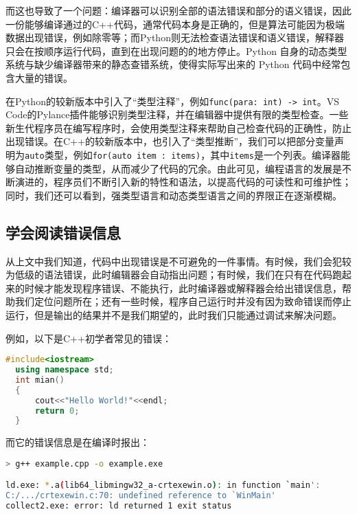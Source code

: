 \documentclass[../main.tex]{subfiles}
\begin{document}
而这也导致了一个问题：编译器可以识别全部的语法错误和部分的语义错误，因此一份能够编译通过的C++代码，通常代码本身是正确的，但是算法可能因为极端数据出现错误，例如除零等；而Python则无法检查语法错误和语义错误，解释器只会在按顺序运行代码，直到在出现问题的的地方停止。Python 自身的动态类型系统与缺少编译器带来的静态查错系统，使得实际写出来的 Python 代码中经常包含大量的错误。

\begin{note}
  在Python的较新版本中引入了“类型注释”，例如\texttt{func(para: int) -> int}。VS Code的Pylance插件能够识别类型注释，并在编辑器中提供有限的类型检查。一些新生代程序员在编写程序时，会使用类型注释来帮助自己检查代码的正确性，防止出现错误。在C++的较新版本中，也引入了“类型推断”，我们可以把部分变量声明为\texttt{auto}类型，例如\texttt{for(auto item : items)}，其中\texttt{items}是一个列表。编译器能够自动推断变量的类型，从而减少了代码的冗余。由此可见，编程语言的发展是不断演进的，程序员们不断引入新的特性和语法，以提高代码的可读性和可维护性；同时，我们还可以看到，强类型语言和动态类型语言之间的界限正在逐渐模糊。
\end{note}

\subsection{学会阅读错误信息}

从上文中我们知道，代码中出现错误是不可避免的一件事情。有时候，我们会犯较为低级的语法错误，此时编辑器会自动指出问题；有时候，我们在只有在代码跑起来的时候才能发现程序错误、不能执行，此时编译器或解释器会给出错误信息，帮助我们定位问题所在；还有一些时候，程序自己运行时并没有因为致命错误而停止运行，但是输出的结果并不是我们期望的，此时我们只能通过调试来解决问题。

例如，以下是C++初学者常见的错误：

\begin{lstlisting}[language=C++]
  #include<iostream>
  using namespace std;
  int mian()
  {
      cout<<"Hello World!"<<endl;
      return 0;
  }
\end{lstlisting}

而它的错误信息是在编译时报出：

\begin{lstlisting}[language=bash]
> g++ example.cpp -o example.exe

ld.exe: *.a(lib64_libmingw32_a-crtexewin.o): in function `main':
C:/.../crtexewin.c:70: undefined reference to `WinMain'
collect2.exe: error: ld returned 1 exit status
\end{lstlisting}
\end{document}
